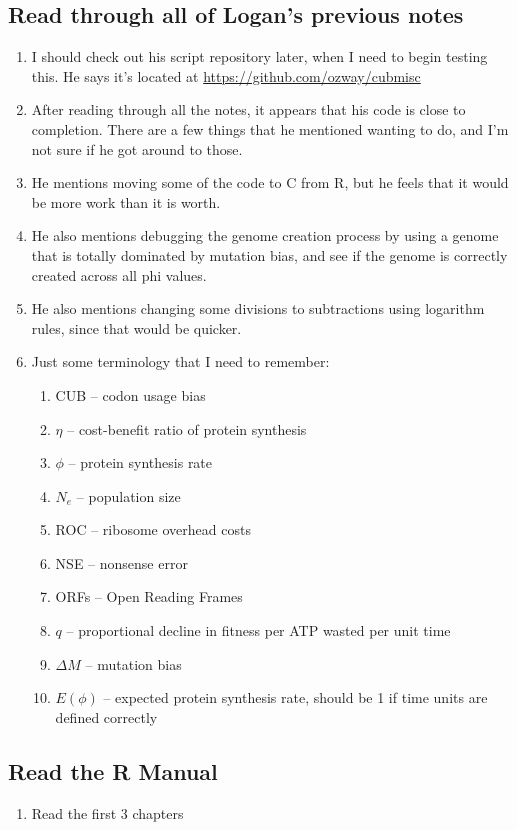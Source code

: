 \documentclass[12 pt]{article}
\begin{document}
	\subsection{Read through all of Logan's previous notes} 
		\begin{enumerate}
			\item I should check out his script repository later, when I need to begin testing this. He says it's located at \url{https://github.com/ozway/cubmisc}
			\item After reading through all the notes, it appears that his code is close to completion. There are a few things that he mentioned wanting to do, and I'm not sure if he got around to those.
			\item He mentions moving some of the code to C from R, but he feels that it would be more work than it is worth.
			\item He also mentions debugging the genome creation process by using a genome that is totally dominated by mutation bias, and see if the genome is correctly created across all phi values.
			\item He also mentions changing some divisions to subtractions using logarithm rules, since that would be quicker.
			
			\item Just some terminology that I need to remember:
			\begin{enumerate}
				\item CUB -- codon usage bias
				\item $ \eta $ -- cost-benefit ratio of protein synthesis
				\item $ \phi $ -- protein synthesis rate
				\item $ N_e $ -- population size
				\item ROC -- ribosome overhead costs
				\item NSE -- nonsense error
				\item ORFs -- Open Reading Frames
				\item $ q $ -- proportional decline in fitness per ATP wasted per unit time
				\item $ \Delta M $ -- mutation bias
				\item $ E(\phi) $ -- expected protein synthesis rate, should be 1 if time units are defined correctly
				
			\end{enumerate} 
		\end{enumerate}
		
		\subsection{Read the R Manual}
		\begin{enumerate}
			\item Read the first 3 chapters
		\end{enumerate}
		
\end{document}

